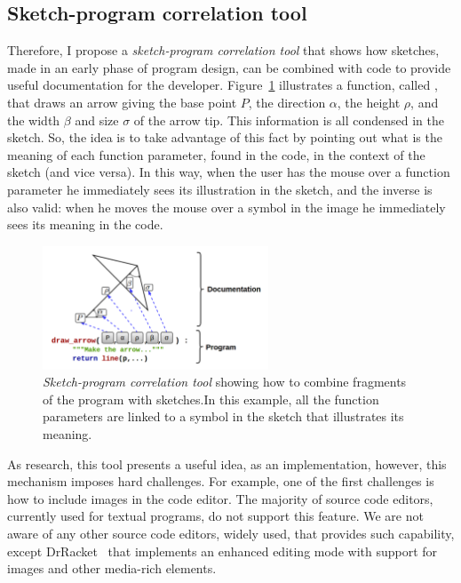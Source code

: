 \subsection{Sketch-program correlation tool}
\label{subsec:sketchtool}

Therefore, I propose a \textit{sketch-program correlation tool} that shows how sketches, made in an early phase of program design, can be combined with code to provide useful documentation for the developer. Figure~\ref{fig:sc-tool} illustrates a function, called , that draws an arrow giving the base point $P$, the direction $\alpha$, the height $\rho$, and the width $\beta$ and size $\sigma$ of the arrow tip. This information is all condensed in the sketch. So, the idea is to take advantage of this fact by pointing out what is the meaning of each function parameter, found in the code, in the context of the sketch (and vice versa). In this way, when the user has the mouse over a function parameter he immediately sees its illustration in the sketch, and the inverse is also valid: when he moves the mouse over a symbol in the image he immediately sees its meaning in the code.

\begin{figure}[!htbp]
  \centering
  \includegraphics[width=0.6\textwidth]{images/proposed-sc-tool}
    \caption{\textit{Sketch-program correlation tool} showing how to combine fragments of the program with sketches.In this example, all the function parameters are linked to a  symbol in the sketch that illustrates its meaning.}
  \label{fig:sc-tool}
\end{figure}

As research, this tool presents a useful idea, as an implementation, however, this mechanism imposes hard challenges. For example, one of the first challenges is how to include images in the code editor. The majority of source code editors, currently used for textual programs, do not support this feature. We are not aware of any other source code editors, widely used, that provides such capability, except DrRacket~\citep{findler2002drscheme} that implements an enhanced editing mode with support for images and other media-rich elements.

